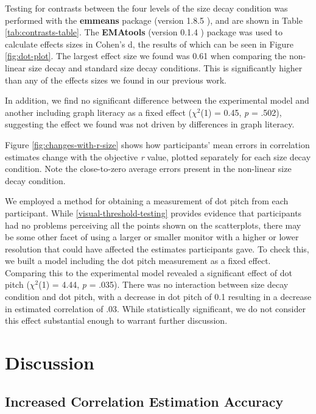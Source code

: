 \documentclass{vgtc}                          %
\begin{document}
Testing for contrasts between the four levels of the size decay condition
was performed with the \textbf{emmeans} package (version 1.8.5 \cite{emmeans}), and
are shown in Table \ref{tab:contrasts-table}. The \textbf{EMAtools} (version
0.1.4 \cite{ematools}) package was used to calculate effects sizes in Cohen's d, the results of which can be seen in Figure \ref{fig:dot-plot}. The largest effect size we found was 0.61 when comparing
the non-linear size decay and standard size decay conditions. This is significantly higher
than any of the effects sizes we found in our previous work.

In addition, we find no significant difference between the experimental model
and another including graph literacy as a fixed effect (\(\chi^2\)(1) = 0.45, \emph{p} = .502), suggesting the effect we found was not driven by differences in graph literacy.

Figure \ref{fig:changes-with-r-size} shows how participants' mean errors in correlation
estimates change with the objective \emph{r} value, plotted separately for each
size decay condition. Note the close-to-zero average errors present in the non-linear size
decay condition.

We employed a method for obtaining
a measurement of dot pitch from each participant. While \autoref{visual-threshold-testing}
provides evidence that participants had no problems perceiving all the points
shown on the scatterplots, there may be some other facet of using a larger or smaller
monitor with a higher or lower resolution that could have affected the estimates
participants gave. To check this, we built a model including the dot pitch
measurement as a fixed effect. Comparing this to the experimental model revealed
a significant effect of dot pitch (\(\chi^2\)(1) = 4.44, \emph{p} = .035). There was no
interaction between size decay condition and dot pitch, with a decrease in dot
pitch of 0.1 resulting in a decrease in estimated correlation of .03.
While statistically significant, we do not consider this effect substantial
enough to warrant further discussion.

\hypertarget{discussion}{%
\section{Discussion}\label{discussion}}

\hypertarget{increased-correlation-estimation-accuracy}{%
\subsection{Increased Correlation Estimation Accuracy}\label{increased-correlation-estimation-accuracy}}
\end{document}

